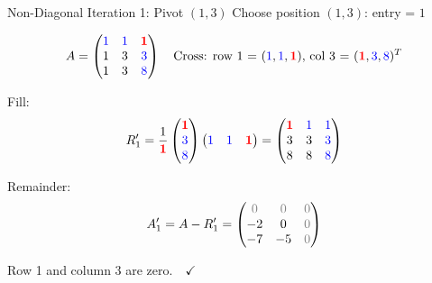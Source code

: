 \documentclass[10pt]{beamer}
\theoremstyle{definition}
\newcommand{\pvt}[1]{{\color{red}\mathbf{#1}}}       %
\newcommand{\crs}[1]{{\color{blue}#1}}                %
\newcommand{\rem}[1]{{\color{gray}#1}}                %
\begin{document}
\begin{frame}{Non-Diagonal Iteration 1: Pivot $(1,3)$}
Choose position $(1,3)$: entry = $1$

$$A = \begin{pmatrix}
\crs1 & \crs1 & \pvt{1} \\
1 & 3 & \crs{3} \\
1 & 3 & \crs{8}
\end{pmatrix}
\quad
\text{Cross: row 1 = $(\crs{1}, \crs{1}, \pvt{1})$, col 3 = $(\pvt{1}, \crs{3}, \crs{8})^T$}
$$

\vfill
Fill:
$$R_1' = \frac{1}{\pvt{1}}
\begin{pmatrix} \pvt{1} \\ \crs{3} \\ \crs{8} \end{pmatrix}
\begin{pmatrix} \crs{1} & \crs{1} & \pvt{1} \end{pmatrix}
= \begin{pmatrix}
\pvt{1} & \crs{1} & \crs{1} \\
3 & 3 & \crs3 \\
{8} & 8 & \crs8
\end{pmatrix}$$

\vfill
Remainder:
$$A_1' = A - R_1' = \begin{pmatrix}
\rem{0} & \rem{0} & \rem{0} \\
-2 & 0 & \rem{0} \\
-7 & -5 & \rem{0}
\end{pmatrix}$$

Row 1 and column 3 are \rem{zero}.\ \ $\checkmark$
\end{frame}
\end{document}
